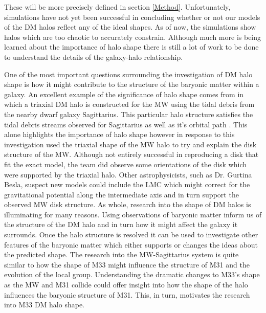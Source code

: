 \documentclass[usenatbib]{mnras}
\begin{document}
These will be more precisely defined in section \ref{Method}. Unfortunately, simulations have not yet been successful in concluding whether or not our models of the DM halos reflect any of the ideal shapes. As of now, the simulations show halos which are too chaotic to accurately constrain. Although much more is being learned about the importance of halo shape there is still a lot of work to be done to understand the details of the galaxy-halo relationship. 


One of the most important questions surrounding the investigation of DM halo shape is how it might contribute to the structure of the baryonic matter within a galaxy. An excellent example of the significance of halo shape comes from \cite{Law10} in which a triaxial DM halo is constructed for the MW using the tidal debris from the nearby dwarf galaxy Sagittarius. This particular halo structure satisfies the tidal debris streams observed for Sagittarius as well as it's orbital path \citep{Law10}. This alone highlights the importance of halo shape however in response to this investigation \cite{Debattista_2013} used the triaxial shape of the MW halo to try and explain the disk structure of the MW. Although not entirely successful in reproducing a disk that fit the exact model, the team did observe some orientations of the disk which were supported by the triaxial halo. Other astrophysicists, such as Dr. Gurtina Besla, suspect new models could include the LMC which might correct for the gravitational potential along the intermediate axis and in turn support the observed MW disk structure. As whole, research into the shape of DM halos is illuminating for many reasons. Using observations of baryonic matter inform us of the structure of the DM halo and in turn how it might affect the galaxy it surrounds. Once the halo structure is resolved it can be used to investigate other features of the baryonic matter which either supports or changes the ideas about the predicted shape. The research into the MW-Sagittarius system is quite similar to how the shape of M33 might influence the structure of M31 and the evolution of the local group. Understanding the dramatic changes to M33's shape as the MW and M31 collide could offer insight into how the shape of the halo influences the baryonic structure of M31. This, in turn, motivates the research into M33 DM halo shape. 
\end{document}
